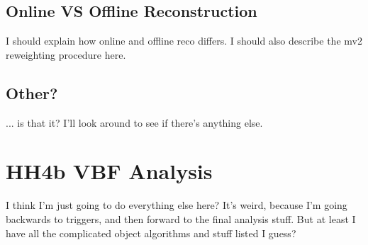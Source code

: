     \subsection{Online VS Offline Reconstruction}
        I should explain how online and offline reco differs.
        I should also describe the mv2 reweighting procedure here.

    \subsection{Other?}
        ... is that it? I'll look around to see if there's anything else.



    





\section{HH4b VBF Analysis}
    
    I think I'm just going to do everything else here? It's weird, because I'm going backwards to triggers,
        and then forward to the final analysis stuff. But at least I have all the complicated object algorithms and stuff listed I guess?


